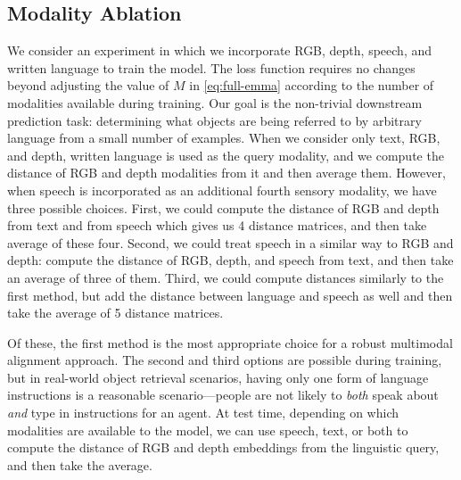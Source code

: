 \documentclass[10pt]{article} %
\newcommand{\todokdinline}[1]{\todo[color=red!20,inline]{{KD: \small #1}}}
\begin{document}
\subsection{Modality Ablation}
\label{sub:ablations}
We consider an experiment in which we incorporate RGB, depth, speech, and written language to train the model. The loss function requires no changes beyond adjusting the value of $M$ in \cref{eq:full-emma} according to the number of modalities available during training. Our goal is the non-trivial downstream prediction task: determining what objects are being referred to by arbitrary language from a small number of examples. When we consider only text, RGB, and depth, written language is used as the query modality, and we compute the distance of RGB and depth modalities from it and then average them. However, when speech is incorporated as an additional fourth sensory modality, we have three possible choices. First, we could compute the distance of RGB and depth from text and from speech which gives us 4 distance matrices, and then take average of these four. Second, we could treat speech in a similar way to RGB and depth: compute the distance of RGB, depth, and speech from text, and then take an average of three of them. Third, we could compute distances similarly to the first method, but add the distance between language and speech as well and then take the average of 5 distance matrices.

Of these, the first method is the most appropriate choice for a robust multimodal alignment approach. The second and third options are possible during training, but in real-world object retrieval scenarios, having only one form of language instructions is a reasonable scenario---people are not likely to \textit{both} speak about \textit{and} type in instructions for an agent. At test time, depending on which modalities are available to the model, we can use speech, text, or both to compute the distance of RGB and depth embeddings from the linguistic query, and then take the average.
\end{document}
